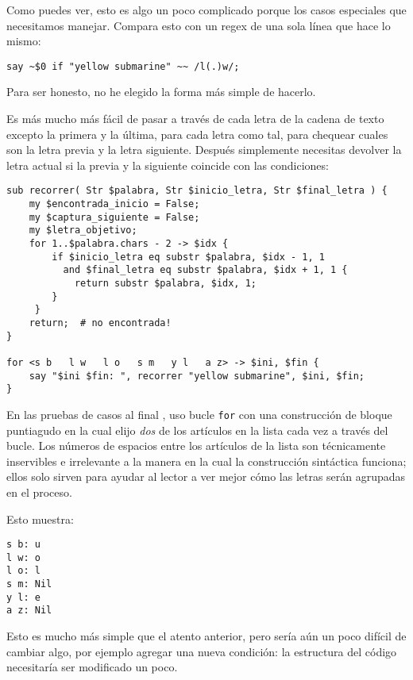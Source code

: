 Como puedes ver, esto es algo un poco complicado porque los
casos especiales que necesitamos manejar. Compara esto con un 
regex de una sola línea que hace lo mismo:

\begin{verbatim}
say ~$0 if "yellow submarine" ~~ /l(.)w/;
\end{verbatim}

Para ser honesto, no he elegido la forma más simple de hacerlo.

Es más mucho más fácil de pasar a través de cada letra de la
cadena de texto excepto la primera y la última, para cada letra
como tal, para chequear cuales son la letra previa y la letra siguiente.
Después simplemente necesitas devolver la letra actual si la
previa y la siguiente coincide con las condiciones:

\begin{verbatim}
sub recorrer( Str $palabra, Str $inicio_letra, Str $final_letra ) {
    my $encontrada_inicio = False;
	my $captura_siguiente = False;
	my $letra_objetivo;
    for 1..$palabra.chars - 2 -> $idx {
        if $inicio_letra eq substr $palabra, $idx - 1, 1
          and $final_letra eq substr $palabra, $idx + 1, 1 {
            return substr $palabra, $idx, 1;
        }
     }
    return;  # no encontrada!
}          

for <s b   l w   l o   s m   y l   a z> -> $ini, $fin {
    say "$ini $fin: ", recorrer "yellow submarine", $ini, $fin;  
}
\end{verbatim}

En las pruebas de casos al final , uso bucle {\tt for} 
con una construcción de bloque puntiagudo en la cual elijo
\emph{dos} de los artículos en la lista cada vez a través del bucle.
Los números de espacios entre los artículos de la lista 
son técnicamente inservibles e irrelevante a la manera en la 
cual la construcción sintáctica funciona; ellos solo sirven para
ayudar al lector a ver mejor cómo las letras serán agrupadas en 
el proceso.

Esto muestra:
\begin{verbatim}
s b: u
l w: o
l o: l
s m: Nil
y l: e
a z: Nil
\end{verbatim}

Esto es mucho más simple que el atento anterior, pero 
sería aún un poco difícil de cambiar algo, por ejemplo
agregar una nueva condición: la estructura del código 
necesitaría ser modificado un poco.

